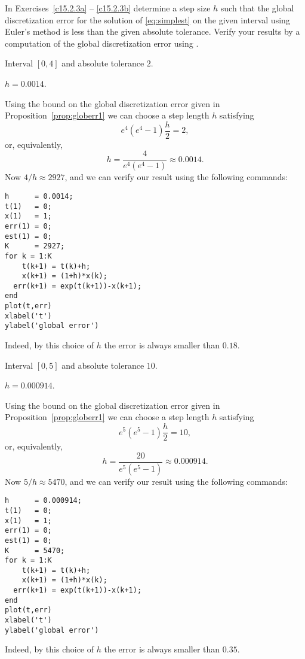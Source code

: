 \documentclass{ximera}
\begin{document}
\noindent In Exercises~\ref{c15.2.3a} -- \ref{c15.2.3b}
determine a step size $h$ such that the global discretization error
for the solution of \eqref{eq:simplest} on the given interval using 
Euler's method is less than the given absolute tolerance.  Verify 
your results by a computation of the global discretization error 
using \Matlabp.
\begin{computerExercise} \label{c15.2.3a}
Interval $[0,4]$ and absolute tolerance $2$.

\begin{solution}
\ans $h=0.0014$.

\soln Using the bound on the global discretization error
given in Proposition~\ref{prop:globerr1} we can choose a
step length $h$ satisfying
\[
e^4(e^4-1)\frac{h}{2} = 2,
\]
or, equivalently,
\[
h = \frac{4}{e^4(e^4-1)} \approx 0.0014.
\]
Now $4/h \approx 2927$, and we can verify our result using the
following \Matlab commands:
\begin{verbatim}
h      = 0.0014;
t(1)   = 0;
x(1)   = 1;
err(1) = 0;
est(1) = 0;
K      = 2927;
for k = 1:K
    t(k+1) = t(k)+h;
    x(k+1) = (1+h)*x(k);
  err(k+1) = exp(t(k+1))-x(k+1);
end
plot(t,err)
xlabel('t')
ylabel('global error')
\end{verbatim}
Indeed, by this choice of $h$ the error is always smaller than $0.18$.


\end{solution}
\end{computerExercise}
\begin{computerExercise} \label{c15.2.3b}
Interval $[0,5]$ and absolute tolerance $10$.

\begin{solution}
\ans $h=0.000914$.

\soln Using the bound on the global discretization error
given in Proposition~\ref{prop:globerr1} we can choose a
step length $h$ satisfying
\[
e^{5}(e^{5}-1)\frac{h}{2} = 10,
\]
or, equivalently,
\[
h = \frac{20}{e^{5}(e^{5}-1)} \approx 0.000914.
\]
Now $5/h \approx 5470$, and we can verify our result using the
following \Matlab commands:
\begin{verbatim}
h      = 0.000914;
t(1)   = 0;
x(1)   = 1;
err(1) = 0;
est(1) = 0;
K      = 5470;
for k = 1:K
    t(k+1) = t(k)+h;
    x(k+1) = (1+h)*x(k);
  err(k+1) = exp(t(k+1))-x(k+1);
end
plot(t,err)
xlabel('t')
ylabel('global error')
\end{verbatim}
Indeed, by this choice of $h$ the error is always smaller than $0.35$.


\end{solution}
\end{computerExercise}
\end{document}
